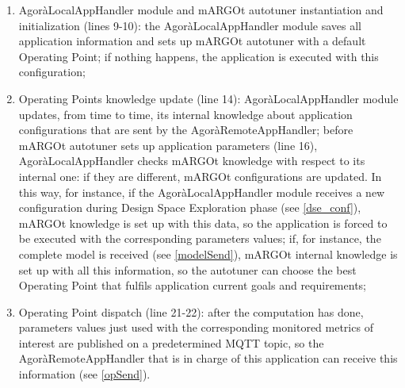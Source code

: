 \begin{enumerate}

    \item AgoràLocalAppHandler module and mARGOt autotuner instantiation and initialization (lines 9-10): the AgoràLocalAppHandler module saves all application information and sets up mARGOt autotuner with a default Operating Point; if nothing happens, the application is executed with this configuration;
    
    \item Operating Points knowledge update (line 14): AgoràLocalAppHandler module updates, from time to time, its internal knowledge about application configurations that are sent by the AgoràRemoteAppHandler; before mARGOt autotuner sets up application parameters (line 16), AgoràLocalAppHandler checks mARGOt knowledge with respect to its internal one: if they are different, mARGOt configurations are updated. In this way, for instance, if the AgoràLocalAppHandler module receives a new configuration during Design Space Exploration phase (see \ref{dse_conf}), mARGOt knowledge is set up with this data, so the application is forced to be executed with the corresponding parameters values; if, for instance, the complete model is received (see \ref{modelSend}), mARGOt internal knowledge is set up with all this information, so the autotuner can choose the best Operating Point that fulfils application current goals and requirements;
    
    \item Operating Point dispatch (line 21-22): after the computation has done, parameters values just used with the corresponding monitored metrics of interest are published on a predetermined MQTT topic, so the AgoràRemoteAppHandler that is in charge of this application can receive this information (see \ref{opSend}).
    
\end{enumerate}
